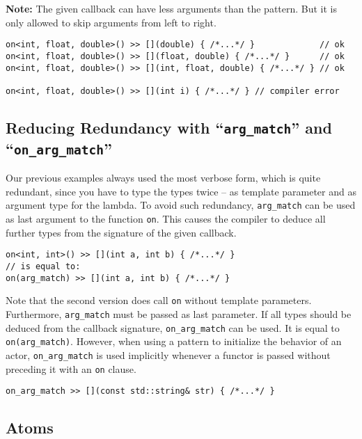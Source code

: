 \textbf{Note:} The given callback can have less arguments than the pattern.
But it is only allowed to skip arguments from left to right.

\begin{lstlisting}
on<int, float, double>() >> [](double) { /*...*/ }             // ok
on<int, float, double>() >> [](float, double) { /*...*/ }      // ok
on<int, float, double>() >> [](int, float, double) { /*...*/ } // ok

on<int, float, double>() >> [](int i) { /*...*/ } // compiler error
\end{lstlisting}

\subsection{Reducing Redundancy with ``\lstinline^arg_match^'' and ``\lstinline^on_arg_match^''}

Our previous examples always used the most verbose form, which is quite redundant, since you have to type the types twice -- as template parameter and as argument type for the lambda.
To avoid such redundancy, \lstinline^arg_match^ can be used as last argument to the function \lstinline^on^.
This causes the compiler to deduce all further types from the signature of the given callback.

\begin{lstlisting}
on<int, int>() >> [](int a, int b) { /*...*/ }
// is equal to:
on(arg_match) >> [](int a, int b) { /*...*/ }
\end{lstlisting}

Note that the second version does call \lstinline^on^ without template parameters.
Furthermore, \lstinline^arg_match^ must be passed as last parameter.
If all types should be deduced from the callback signature, \lstinline^on_arg_match^ can be used.
It is equal to \lstinline^on(arg_match)^.
However, when using a pattern to initialize the behavior of an actor, \lstinline^on_arg_match^ is used implicitly whenever a functor is passed without preceding it with an \lstinline^on^ clause.

\begin{lstlisting}
on_arg_match >> [](const std::string& str) { /*...*/ }
\end{lstlisting}

\subsection{Atoms}
\label{Sec::PatternMatching::Atoms}

